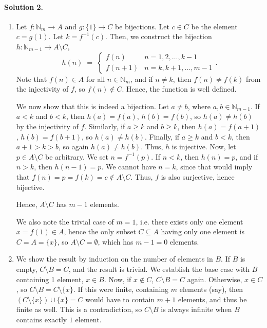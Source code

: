 \documentclass[10pt]{article}
\begin{document}
        \paragraph{Solution 2.}
        \begin{enumerate}
                \item Let $f\colon \mathbb{N}_m \to A$ and $g\colon \{1\} \to C$ be bijections.
                Let $c \in C$ be the element $c = g(1)$. Let $k = f^{-1}(c)$.
                Then, we construct the bijection
                $h\colon \mathbb{N}_{m-1} \to A\setminus C$,
                \[
                h(n) \;=\; \begin{cases}
                        f(n)    &       n = 1, 2, \dots, k-1 \\
                        f(n + 1)&       n = k, k + 1, \dots, m-1
                \end{cases}.
                \]
                Note that $f(n) \in A$ for all $n \in \mathbb{N}_{m}$, and if $n \neq k$, then $f(n) \neq f(k)$ from the injectivity of $f$, so
                $f(n) \notin C$. Hence, the function is well defined.

                We now show that this is indeed a bijection. Let $a \neq b$, where $a, b \in \mathbb{N}_{m - 1}$.
                If $a < k$ and $b < k$, then $h(a) = f(a)$, $h(b) = f(b)$, so $h(a) \neq h(b)$ by the injectivity of $f$.
                Similarly, if $a \geq k$ and $b \geq k$, then $h(a) = f(a + 1)$ , $h(b) = f(b + 1)$, so $h(a) \neq h(b)$.
                Finally, if $a \geq k$ and $b < k$, then $a + 1 > k > b$, so again $h(a) \neq h(b)$. Thus, $h$ is injective.
                Now, let $p \in A\setminus C$ be arbitrary. We set $n = f^{-1}(p)$. If $n < k$, then $h(n) = p$, and if $n > k$, 
                then $h(n - 1) = p$. We cannot have $n = k$, since that would imply that $f(n) = p = f(k) = c \notin A\setminus C$. Thus,
                $f$ is also surjective, hence bijective.

                Hence, $A\setminus C$ has $m - 1$ elements.

                We also note the trivial case of $m = 1$, i.e. there exists only one element $x = f(1) \in A$, hence the only
                subset $C \subseteq A$ having only one element is $C = A = \{x\}$, so $A\setminus C = \emptyset$, which has $m - 1 = 0$ elements.

                \item We show the result by induction on the number of elements in $B$. If $B$ is empty, $C\setminus B = C$, and the result is trivial.
                We establish the base case with $B$ containing 1 element, $x \in B$. Now, if $x \notin C$, $C\setminus B = C$ again.
                Otherwise, $x \in C$, so $C\setminus B = C\setminus\{x\}$.
                If this were finite, containing $m$ elements (say), then $(C\setminus\{x\}) \cup \{x\} = C$
                would have to contain $m + 1$ elements, and thus be finite as well. This is a contradiction, so $C\setminus B$ is always infinite
                when $B$ contains exactly $1$ element.



\end{enumerate}
\end{document}
